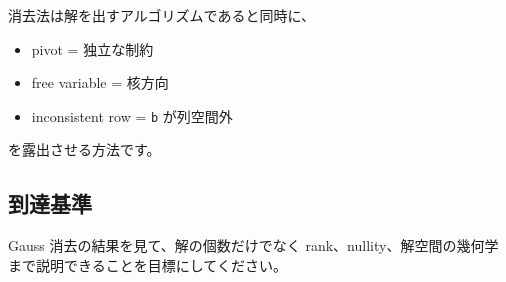 \documentclass[
  11pt,
  a4paper,
]{ltjsarticle}
\providecommand{\tightlist}{%
  \setlength{\itemsep}{0pt}\setlength{\parskip}{0pt}}
\begin{document}
消去法は解を出すアルゴリズムであると同時に、

\begin{itemize}
\tightlist
\item
  pivot = 独立な制約
\item
  free variable = 核方向
\item
  inconsistent row = \texttt{b} が列空間外
\end{itemize}

を露出させる方法です。

\hypertarget{ux5230ux9054ux57faux6e96}{%
\subsection{到達基準}\label{ux5230ux9054ux57faux6e96}}

Gauss 消去の結果を見て、解の個数だけでなく
rank、nullity、解空間の幾何学まで説明できることを目標にしてください。
\end{document}

